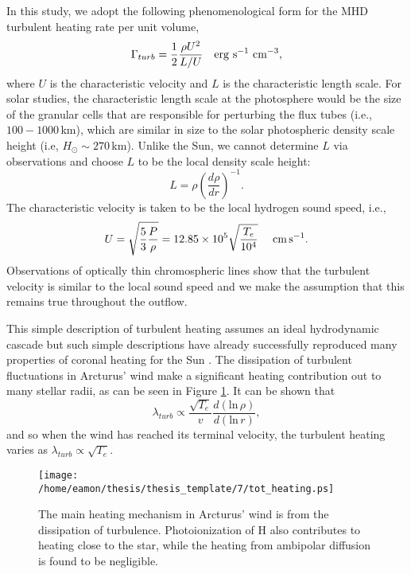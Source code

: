 In this study, we adopt the following phenomenological form for the MHD turbulent heating rate per unit volume,
\begin{equation}
\Gamma_{turb} =\frac{1}{2}\frac{\rho U^{2}}{L/U}\ \ \ \rm{erg \ s^{-1} \ cm^{-3}},
\end{equation} 
where $U$ is the characteristic velocity and $L$ is the characteristic length scale. For solar studies, the characteristic length scale at the photosphere would be the size of the granular cells that are responsible for perturbing the flux tubes (i.e., $100-1000$\,km), which are similar in size to the solar photospheric density scale height (i.e, $H_{\odot} \sim 270$\,km). Unlike the Sun, we cannot determine $L$ via observations and choose $L$ to be the local density scale height:
\begin{equation}
L = \rho \left(\dfrac{d\rho}{dr} \right)^{-1}.
\end{equation}
The characteristic velocity is taken to be the local hydrogen sound speed, i.e., 
\begin{equation}
U=\sqrt{\frac{5}{3}\dfrac{P}{\rho}}=12.85\times 10^{5}\sqrt{\frac{T_{e}}{10^4}}\ \ \ \ \rm{cm}\,\rm{s}^{-1}.
\end{equation}
Observations of optically thin chromospheric lines show that the turbulent velocity is similar to the local sound speed and we make the assumption that this remains true throughout the outflow. 

This simple description of turbulent heating assumes an ideal \cite{kolmogorov_1941} hydrodynamic cascade but such simple descriptions have already successfully reproduced many properties of coronal heating for the Sun \citep{cranmer_2012}. The dissipation of turbulent fluctuations in Arcturus' wind make a significant heating contribution out to many stellar radii, as can be seen in Figure \ref{fig:7.5}. It can be shown that 
\begin{equation}
\lambda_{turb} \propto \frac{\sqrt{T_e}}{v}\frac{d(\mathrm{ln}\,\rho)}{d(\mathrm{ln}\,r)},
\end{equation} 
and so when the wind has reached its terminal velocity, the turbulent heating varies as $\lambda_{turb} \propto \sqrt{T_e}$.

\begin{figure}[!ht]
\centering 
         \texttt{[image: /home/eamon/thesis/thesis\_template/7/tot\_heating.ps]}
\caption[Main heating mechanisms in Arcturus' wind]{The main heating mechanism in Arcturus' wind is from the dissipation of turbulence. Photoionization of H also contributes to heating close to the star, while the heating from ambipolar diffusion is found to be negligible.}
\label{fig:7.5}
\end{figure}

